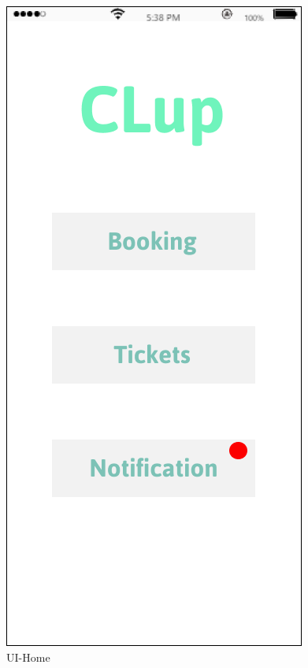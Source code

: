 \documentclass[a4paper,12pt]{report}
\begin{document}
\begin{figure}[H]
	\begin{minipage}[t]{0.5\linewidth}
		\centering
		\includegraphics[scale=0.5]{UI-Home.png}
		\caption{UI-Home}
		\label{UI-Home}
	\end{minipage}%
	\begin{minipage}[t]{0.5\linewidth}
		\centering

\end{minipage}
\end{figure}
\end{document}
